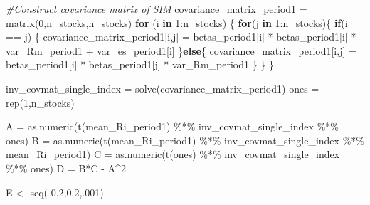 \documentclass[
]{article}
\newenvironment{Shaded}{\begin{snugshade}}{\end{snugshade}}
\newcommand{\CommentTok}[1]{\textcolor[rgb]{0.56,0.35,0.01}{\textit{#1}}}
\newcommand{\ControlFlowTok}[1]{\textcolor[rgb]{0.13,0.29,0.53}{\textbf{#1}}}
\newcommand{\DecValTok}[1]{\textcolor[rgb]{0.00,0.00,0.81}{#1}}
\newcommand{\FloatTok}[1]{\textcolor[rgb]{0.00,0.00,0.81}{#1}}
\newcommand{\FunctionTok}[1]{\textcolor[rgb]{0.00,0.00,0.00}{#1}}
\newcommand{\NormalTok}[1]{#1}
\newcommand{\OtherTok}[1]{\textcolor[rgb]{0.56,0.35,0.01}{#1}}
\newcommand{\SpecialCharTok}[1]{\textcolor[rgb]{0.00,0.00,0.00}{#1}}
\begin{document}
\begin{Shaded}
\begin{Highlighting}[]
\CommentTok{\#Construct covariance matrix of SIM }
\NormalTok{covariance\_matrix\_period1 }\OtherTok{=} \FunctionTok{matrix}\NormalTok{(}\DecValTok{0}\NormalTok{,n\_stocks,n\_stocks)}
\ControlFlowTok{for}\NormalTok{ (i }\ControlFlowTok{in} \DecValTok{1}\SpecialCharTok{:}\NormalTok{n\_stocks)}
\NormalTok{\{}
  \ControlFlowTok{for}\NormalTok{(j }\ControlFlowTok{in} \DecValTok{1}\SpecialCharTok{:}\NormalTok{n\_stocks)\{}
    \ControlFlowTok{if}\NormalTok{(i }\SpecialCharTok{==}\NormalTok{ j)}
\NormalTok{    \{}
\NormalTok{      covariance\_matrix\_period1[i,j] }\OtherTok{=}\NormalTok{ betas\_period1[i] }\SpecialCharTok{*}\NormalTok{ betas\_period1[i] }\SpecialCharTok{*}\NormalTok{ var\_Rm\_period1 }\SpecialCharTok{+}\NormalTok{ var\_es\_period1[i]}
\NormalTok{    \}}\ControlFlowTok{else}\NormalTok{\{}
\NormalTok{      covariance\_matrix\_period1[i,j] }\OtherTok{=}\NormalTok{ betas\_period1[i] }\SpecialCharTok{*}\NormalTok{ betas\_period1[j] }\SpecialCharTok{*}\NormalTok{ var\_Rm\_period1}
\NormalTok{    \}}
\NormalTok{  \}}
\NormalTok{\}}

\NormalTok{inv\_covmat\_single\_index }\OtherTok{=} \FunctionTok{solve}\NormalTok{(covariance\_matrix\_period1)}
\NormalTok{ones }\OtherTok{=} \FunctionTok{rep}\NormalTok{(}\DecValTok{1}\NormalTok{,n\_stocks)}

\NormalTok{A }\OtherTok{=} \FunctionTok{as.numeric}\NormalTok{(}\FunctionTok{t}\NormalTok{(mean\_Ri\_period1) }\SpecialCharTok{\%*\%}\NormalTok{ inv\_covmat\_single\_index }\SpecialCharTok{\%*\%}\NormalTok{ ones) }
\NormalTok{B }\OtherTok{=} \FunctionTok{as.numeric}\NormalTok{(}\FunctionTok{t}\NormalTok{(mean\_Ri\_period1) }\SpecialCharTok{\%*\%}\NormalTok{ inv\_covmat\_single\_index }\SpecialCharTok{\%*\%}\NormalTok{ mean\_Ri\_period1) }
\NormalTok{C }\OtherTok{=} \FunctionTok{as.numeric}\NormalTok{(}\FunctionTok{t}\NormalTok{(ones)  }\SpecialCharTok{\%*\%}\NormalTok{ inv\_covmat\_single\_index }\SpecialCharTok{\%*\%}\NormalTok{ ones) }
\NormalTok{D }\OtherTok{=}\NormalTok{ B}\SpecialCharTok{*}\NormalTok{C }\SpecialCharTok{{-}}\NormalTok{ A}\SpecialCharTok{\^{}}\DecValTok{2}

\NormalTok{E }\OtherTok{\textless{}{-}} \FunctionTok{seq}\NormalTok{(}\SpecialCharTok{{-}}\FloatTok{0.2}\NormalTok{,}\FloatTok{0.2}\NormalTok{,.}\DecValTok{001}\NormalTok{)}


\end{Highlighting}
\end{Shaded}
\end{document}
